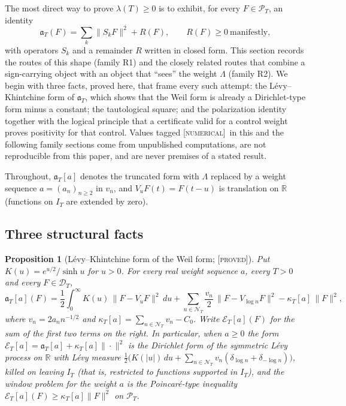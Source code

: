 \documentclass[11pt]{amsart}
\newtheorem{proposition}[theorem]{Proposition}
\theoremstyle{definition}
\theoremstyle{remark}
\numberwithin{equation}{section}
\newcommand{\R}{\mathbb{R}}
\newcommand{\IT}{I_T}                                  %
\newcommand{\PT}{\mathcal{P}_T}                        %
\newcommand{\DT}{\mathcal{D}_T}                        %
\newcommand{\NT}{\mathcal{N}_T}                        %
\newcommand{\aT}{\mathfrak{a}_T}                       %
\newcommand{\lam}{\lambda(T)}                          %
\newcommand{\stag}[1]{\textsc{[#1]}}
\newcommand{\PROVED}{\stag{proved}}
\newcommand{\NUM}{\stag{numerical}}
\begin{document}
The most direct way to prove $\lam\ge0$ is to exhibit, for every $F\in\PT$, an identity
\begin{equation}\label{w4:eq:sosshape}
\aT(F)=\sum_k\|S_kF\|^2+R(F),\qquad R(F)\ge0\ \text{manifestly},
\end{equation}
with operators $S_k$ and a remainder $R$ written in closed form. This section records the routes of this shape
(family R1) and the closely related routes that combine a sign-carrying object with an object that ``sees'' the
weight $\Lambda$ (family R2). We begin with three facts, proved here, that frame every such attempt: the
L\'evy--Khintchine form of $\aT$, which shows that the Weil form is already a Dirichlet-type form minus a constant;
the tautological square; and the polarization identity together with the logical principle that a certificate
valid for a control weight proves positivity for that control. Values tagged \NUM\ in this and the following family sections come
from unpublished computations, are not reproducible from this paper, and are never premises of a stated result.

Throughout, $\aT[a]$ denotes the truncated form with $\Lambda$ replaced by a weight sequence $a=(a_n)_{n\ge2}$ in
$v_n$, and $V_uF(t)=F(t-u)$ is translation on $\R$ (functions on $\IT$ are extended by zero).

\subsection{Three structural facts}

\begin{proposition}[L\'evy--Khintchine form of the Weil form; \PROVED]\label{w4:prop:levy}
Put $K(u)=e^{u/2}/\sinh u$ for $u>0$. For every real weight sequence $a$, every $T>0$ and every $F\in\DT$,
\begin{equation}\label{w4:eq:levy}
\aT[a](F)=\frac12\int_0^\infty K(u)\,\|F-V_uF\|^2\,du+\sum_{n\in\NT}\frac{v_n}{2}\,\|F-V_{\log n}F\|^2-\kappa_T[a]\,\|F\|^2,
\end{equation}
where $v_n=2a_nn^{-1/2}$ and $\kappa_T[a]=\sum_{n\in\NT}v_n-C_0$. Write $\mathcal E_T[a](F)$ for the sum of the first two terms on the
right. In particular, when $a\ge0$ the form $\mathcal E_T[a]=\aT[a]+\kappa_T[a]\|\cdot\|^2$ is
the Dirichlet form of the symmetric L\'evy process on $\R$ with L\'evy measure $\frac12\big(K(|u|)\,du+\sum_{n\in\NT}v_n(\delta_{\log n}+\delta_{-\log n})\big)$,
killed on leaving $\IT$ (that is, restricted to functions supported in $\IT$), and the window problem for the weight $a$ is the Poincar\'e-type inequality
$\mathcal E_T[a](F)\ge\kappa_T[a]\|F\|^2$ on $\PT$.
\end{proposition}
\end{document}
